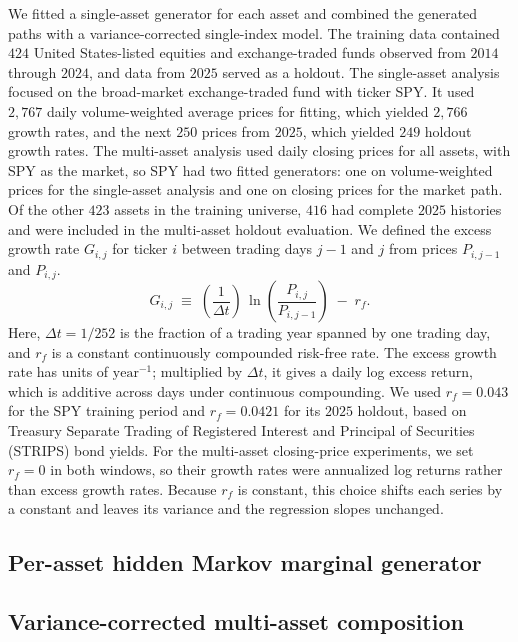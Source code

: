 \documentclass{article}
\theoremstyle{definition}
\theoremstyle{remark}
\begin{document}
We fitted a single-asset generator for each asset and combined the generated paths with a variance-corrected single-index model. The training data contained $424$ United States-listed equities and
exchange-traded funds observed from $2014$ through $2024$, and data
from $2025$ served as a holdout. The
single-asset analysis focused on the broad-market exchange-traded fund
with ticker SPY. It used
$2{,}767$ daily volume-weighted average prices for fitting, which
yielded $2{,}766$ growth rates, and the next $250$ prices from $2025$,
which yielded $249$ holdout growth rates. The multi-asset analysis used daily closing prices for all assets,
with SPY as the market, so SPY had two fitted generators: one on
volume-weighted prices for the single-asset analysis and one on
closing prices for the market path. Of
the other $423$ assets in the training universe, $416$ had complete
$2025$ histories and were included in the multi-asset holdout
evaluation. We defined the excess growth rate
$G_{i,j}$ for ticker $i$ between trading days $j-1$ and $j$ from prices
$P_{i,j-1}$ and $P_{i,j}$.
\begin{equation}
    G_{i,j} \;\equiv\; \left(\frac{1}{\Delta t}\right)\,
    \ln\!\left( \frac{P_{i,j}}{P_{i,j-1}} \right) \;-\; r_f.
    \label{eq:growth_rate}
\end{equation}
Here, $\Delta t = 1/252$ is the fraction of a trading year spanned by
one trading day, and $r_f$ is a constant continuously compounded
risk-free rate. The excess growth rate has units of
$\mathrm{year}^{-1}$; multiplied by $\Delta t$, it gives a daily log
excess return, which is additive across days under continuous
compounding. We used $r_f=0.043$ for the SPY training period and
$r_f=0.0421$ for its $2025$ holdout, based on Treasury Separate Trading
of Registered Interest and Principal of Securities (STRIPS) bond yields.
For the multi-asset closing-price experiments, we set $r_f=0$ in both
windows, so their growth rates were annualized log returns rather than excess
growth rates. Because
$r_f$ is constant, this choice shifts each series by a constant and leaves its variance
and the regression slopes unchanged.

\subsection{Per-asset hidden Markov marginal generator}\label{sec:method-hmm}


\subsection{Variance-corrected multi-asset composition}\label{sec:method-sim}



\end{document}
